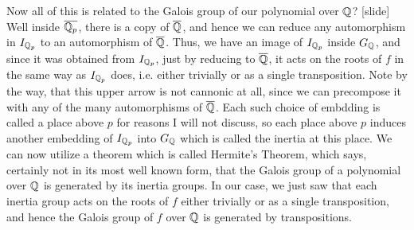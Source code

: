 \documentclass[../../main.tex]{subfiles}
\begin{document}
Now all of this is related to the Galois group of our polynomial over $\mathbb{Q}$?
[slide]
Well inside $\overline{\mathbb{Q}_p}$, there is a copy of $\overline{\mathbb{Q}}$, and hence we can reduce any automorphism in $I_{\mathbb{Q}_p}$ to an automorphism of $\overline{\mathbb{Q}}$.
Thus, we have an image of $I_{\mathbb{Q}_p}$ inside $G_{\mathbb{Q}}$, and since it was obtained from $I_{\mathbb{Q}_p}$, just by reducing to $\overline{\mathbb{Q}}$, it acts on the roots of $f$ in the same way as $I_{\mathbb{Q}_p}$ does, i.e. either trivially or as a single transposition.
Note by the way, that this upper arrow is not cannonic at all, since we can precompose it with any of the many automorphisms of $\overline{\mathbb{Q}}$.
Each such choice of embdding is called a place above $p$ for reasons I will not discuss, so each place above $p$ induces another embedding of $I_{\mathbb{Q}_p}$ into $G_{\mathbb{Q}}$ which is called the inertia at this place.
We can now utilize a theorem which is called Hermite's Theorem, which says, certainly not in its most well known form, that the Galois group of a polynomial over $\mathbb{Q}$ is generated by its inertia groups.
In our case, we just saw that each inertia group acts on the roots of $f$ either trivially or as a single transposition, and hence the Galois group of $f$ over $\mathbb{Q}$ is generated by transpositions.
\end{document}
